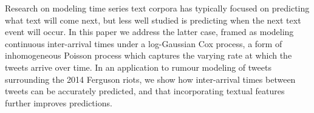 Research on modeling time series text corpora has typically focused on predicting what text will come next, but less well studied is predicting when the next text event will occur. In this paper we address the latter case, framed as modeling continuous inter-arrival times under a log-Gaussian Cox process, a form of inhomogeneous Poisson process which captures the varying rate at which the tweets arrive over time. In an application to rumour modeling of tweets surrounding the 2014 Ferguson riots, we show how inter-arrival times between tweets can be accurately predicted, and that incorporating textual features further improves predictions.
